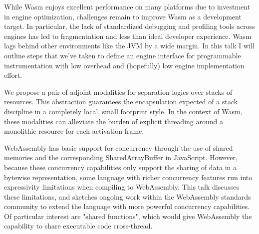 \documentclass[a4paper,UKenglish]{dagrep-v2018}
\begin{document}
\license

While Wasm enjoys excellent performance on many platforms due to investment in engine optimization, challenges remain to improve Wasm as a development target. In particular, the lack of standardized debugging and profiling tools across engines has led to fragmentation and less than ideal developer experience. Wasm lags behind other environments like the JVM by a wide margin. In this talk I will outline steps that we’ve taken to define an engine interface for programmable instrumentation with low overhead and (hopefully) low engine implementation effort.

\license
{}

We propose a pair of adjoint modalities for separation logics over stacks of resources. This abstraction guarantees the encapsulation expected of a stack discipline in a completely local, small footprint style. In the context of Wasm, these modalities can alleviate the burden of explicit threading around a monolithic resource for each activation frame.

\license
{}

WebAssembly has basic support for concurrency through the use of shared memories and the corresponding SharedArrayBuffer in JavaScript. However, because these concurrency capabilities only support the sharing of data in a bytewise representation, some language with richer concurrency features run into expressivity limitations when compiling to WebAssembly. This talk discusses these limitations, and sketches ongoing work within the WebAssembly standards community to extend the language with more powerful concurrency capabilities. Of particular interest are "shared functions", which would give WebAssembly the capability to share executable code cross-thread.
\end{document}

